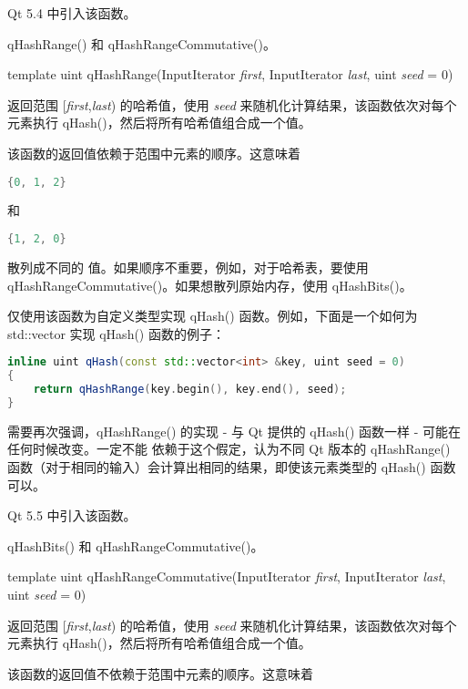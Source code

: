 Qt 5.4 中引入该函数。


\begin{notice}[另请参阅]
qHashRange() 和 qHashRangeCommutative()。
\end{notice}

template uint qHashRange(InputIterator \emph{first}, InputIterator \emph{last}, uint \emph{seed} = 0)

返回范围 [\emph{first},\emph{last}) 的哈希值，使用 \emph{seed} 来随机化计算结果，该函数依次对每个元素执行 qHash()，然后将所有哈希值组合成一个值。

该函数的返回值依赖于范围中元素的顺序。这意味着

\begin{lstlisting}[language=C++]
{0, 1, 2}
\end{lstlisting}

和

\begin{lstlisting}[language=C++]
{1, 2, 0}
\end{lstlisting}

散列成不同的 值。如果顺序不重要，例如，对于哈希表，要使用 qHashRangeCommutative()。如果想散列原始内存，使用 qHashBits()。

仅使用该函数为自定义类型实现 qHash() 函数。例如，下面是一个如何为
std::vector 实现 qHash() 函数的例子：

\begin{lstlisting}[language=C++]
inline uint qHash(const std::vector<int> &key, uint seed = 0)
{
    return qHashRange(key.begin(), key.end(), seed);
}
\end{lstlisting}

需要再次强调，qHashRange() 的实现 - 与 Qt 提供的 qHash() 函数一样 - 可能在任何时候改变。一定不能 依赖于这个假定，认为不同 Qt 版本的 qHashRange() 函数（对于相同的输入）会计算出相同的结果，即使该元素类型的 qHash() 函数可以。

Qt 5.5 中引入该函数。

\begin{notice}[另请参阅]
qHashBits() 和 qHashRangeCommutative()。
\end{notice}


template uint qHashRangeCommutative(InputIterator \emph{first}, InputIterator \emph{last}, uint \emph{seed} = 0)

返回范围 [\emph{first},\emph{last}) 的哈希值，使用 \emph{seed} 来随机化计算结果，该函数依次对每个元素执行 qHash()，然后将所有哈希值组合成一个值。

该函数的返回值不依赖于范围中元素的顺序。这意味着

